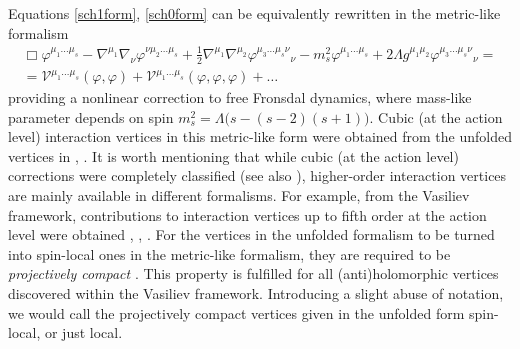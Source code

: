 \documentclass[12pt]{article}
\begin{document}
Equations \eqref{sch1form}, \eqref{sch0form} can be equivalently rewritten in the metric-like formalism
\begin{multline}
\Box \varphi^{\mu_1\ldots \mu_s}-\nabla^{\mu_1}\nabla_\nu \varphi^{\nu\mu_2\ldots \mu_s}+\frac{1}{2}\nabla^{\mu_1}\nabla^{\mu_2}\varphi^{\mu_3\ldots \mu_s \nu} {}_\nu-m_s^2\varphi^{\mu_1\ldots \mu_s}+2\Lambda g^{\mu_1\mu_2}\varphi^{\mu_3\ldots \mu_s\nu} {}_\nu=\\
=\mathcal{V}^{\mu_1\ldots\mu_s}(\varphi,\varphi)+\mathcal{V}^{\mu_1\ldots\mu_s}(\varphi,\varphi,\varphi)+\ldots
\end{multline}
providing a nonlinear correction to free Fronsdal dynamics,  where mass-like parameter depends on spin $m_s^2=\Lambda\big(s-(s-2)(s+1)\big)$. Cubic (at the action level) interaction vertices in this metric-like form were obtained from the unfolded vertices in \cite{Misuna:2017bjb}, \cite{Tatarenko:2024csa}. It is worth mentioning that while cubic (at the action level) corrections were completely classified \cite{Metsaev:2005ar} (see also \cite{Metsaev:2007rn}), higher-order interaction vertices are mainly available in different formalisms. For example, from the Vasiliev framework, contributions to interaction vertices up to fifth order at the action level were obtained \cite{Didenko:2019xzz}, \cite{Didenko:2020bxd}, \cite{Gelfond:2021two}. For the vertices in the unfolded formalism to be turned into spin-local ones in the metric-like formalism, they are required to be {\it projectively compact} \cite{Vasiliev:2022med}. This property is fulfilled for all (anti)holomorphic vertices discovered within the Vasiliev framework. Introducing a slight abuse of notation, we would call the projectively compact vertices given in the unfolded form spin-local, or just local.
\end{document}
